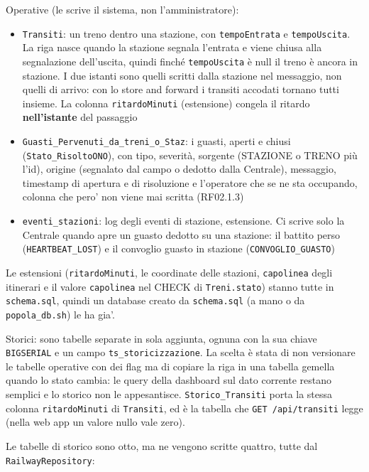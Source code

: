 \documentclass[11pt]{article}
\begin{document}
Operative (le scrive il sistema, non l'amministratore):
\begin{itemize}
\item \texttt{Transiti}: un treno dentro una stazione, con \texttt{tempoEntrata} e \texttt{tempoUscita}. La riga
nasce quando la stazione segnala l'entrata e viene chiusa alla segnalazione dell'uscita,
quindi finché \texttt{tempoUscita} è null il treno è ancora in stazione. I due istanti sono quelli
scritti dalla stazione nel messaggio, non quelli di arrivo: con lo store and forward i transiti
accodati tornano tutti insieme. La colonna \texttt{ritardoMinuti} (estensione) congela il ritardo
\textbf{nell'istante} del passaggio
\item \texttt{Guasti\_Pervenuti\_da\_treni\_o\_Staz}: i guasti, aperti e chiusi (\texttt{Stato\_RisoltoONO}), con tipo,
severità, sorgente (STAZIONE o TRENO più l'id), origine (segnalato dal campo o dedotto dalla
Centrale), messaggio, timestamp di apertura e di risoluzione e l'operatore che se ne sta
occupando, colonna che pero' non viene mai scritta (RF02.1.3)
\item \texttt{eventi\_stazioni}: log degli eventi di stazione, estensione. Ci scrive solo la Centrale quando
apre un guasto dedotto su una stazione: il battito perso (\texttt{HEARTBEAT\_LOST}) e il convoglio guasto
in stazione (\texttt{CONVOGLIO\_GUASTO})
\end{itemize}

Le estensioni (\texttt{ritardoMinuti}, le coordinate delle stazioni, \texttt{capolinea} degli itinerari e il
valore \texttt{capolinea} nel CHECK di \texttt{Treni.stato}) stanno tutte in \texttt{schema.sql}, quindi un database
creato da \texttt{schema.sql} (a mano o da \texttt{popola\_db.sh}) le ha gia'.

Storici: sono tabelle separate in sola aggiunta, ognuna con la sua chiave \texttt{BIGSERIAL} e un campo
\texttt{ts\_storicizzazione}. La scelta è stata di non versionare le tabelle operative con dei flag
ma di copiare la riga in una tabella gemella quando lo stato cambia: le query della
dashboard sul dato corrente restano semplici e lo storico non le appesantisce.
\texttt{Storico\_Transiti} porta la stessa colonna \texttt{ritardoMinuti} di \texttt{Transiti}, ed è la tabella che
\texttt{GET /api/transiti} legge (nella web app un valore nullo vale zero).

Le tabelle di storico sono otto, ma ne vengono scritte quattro, tutte dal \texttt{RailwayRepository}:
\end{document}
